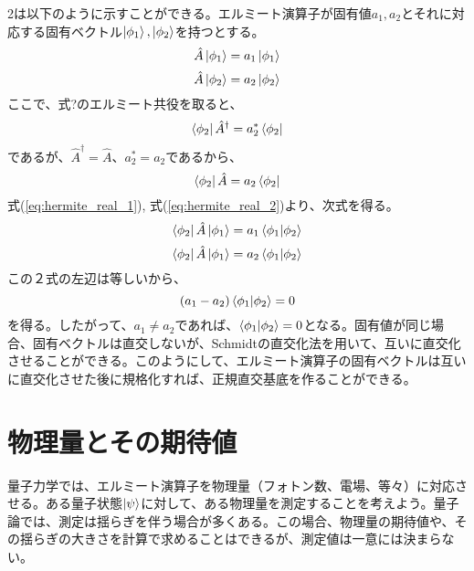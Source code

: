 2は以下のように示すことができる。エルミート演算子が固有値$a_1 , a_2$とそれに対応する固有ベクトル$\ket {\phi_1}, \ket {\phi_2}$を持つとする。
\begin{equation}
  \hat A\ket {\phi_1} = a_1\ket{\phi_1}
\end{equation}
\begin{equation}
  \hat A\ket{\phi_2} = a_2\ket{\phi_2}
\end{equation}
ここで、式?のエルミート共役を取ると、
\begin{equation}
  \bra{\phi_2}\hat A^\dagger = a_2^*\bra{\phi_2}
\end{equation}
であるが、$\hat A^\dagger = \hat A$、$a_2^* = a_2$であるから、
\begin{equation}
  \bra{\phi_2}\hat A = a_2\bra{\phi_2}
\end{equation}
式(\ref{eq:hermite_real_1}), 式(\ref{eq:hermite_real_2})より、次式を得る。
\begin{equation}
  \bra{\phi_2}\hat A\ket{\phi_1} = a_1\braket{\phi_1|\phi_2}
\end{equation}
\begin{equation}
  \bra{\phi_2}\hat A\ket{\phi_1} = a_2\braket{\phi_1|\phi_2}
\end{equation}
この２式の左辺は等しいから、
\begin{equation}
  (a_1 - a_2)\braket{\phi_1|\phi_2} = 0
\end{equation}
を得る。したがって、$a_1 \neq a_2$であれば、$\braket{\phi_1|\phi_2}=0$となる。固有値が同じ場合、固有ベクトルは直交しないが、Schmidtの直交化法を用いて、互いに直交化させることができる。このようにして、エルミート演算子の固有ベクトルは互いに直交化させた後に規格化すれば、正規直交基底を作ることができる。

\section{物理量とその期待値}

量子力学では、エルミート演算子を物理量（フォトン数、電場、等々）に対応させる。ある量子状態$\ket\psi$に対して、ある物理量を測定することを考えよう。量子論では、測定は揺らぎを伴う場合が多くある。この場合、物理量の期待値や、その揺らぎの大きさを計算で求めることはできるが、測定値は一意には決まらない。

